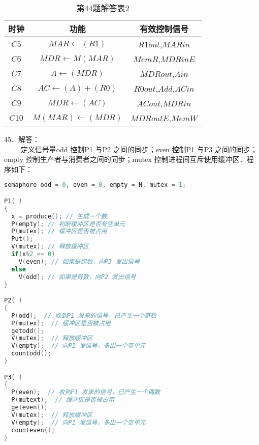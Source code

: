 \begin{table}[ht]
\centering
\caption{第44题解答表2}\label{CSN09_tab7}
\begin{tabular}{|c|c|c|}
\hline
时钟 & 功能 & 有效控制信号 \\
\hline
$C5$ & $MAR\leftarrow(R1)$ & $R1out$,$MARin$ \\
\hline
$C6$ & $MDR\leftarrow M(MAR)$ & $MemR$,$MDRinE$ \\
\hline
$C7$ & $A\leftarrow(MDR)$ & $MDRout$,$Ain$ \\
\hline
$C8$ & $AC\leftarrow(A)+(R0)$ & $R0out$,$Add$,$ACin$ \\
\hline
$C9$ & $MDR\leftarrow(AC)$ & $ACout$,$MDRin$ \\
\hline
$C10$ & $M(MAR)\leftarrow(MDR)$ & $MDRoutE$,$MemW$ \\
\hline
\end{tabular}
\end{table}

45．解答： \\
$\qquad$ 定义信号量odd 控制P1 与P2 之间的同步；even 控制P1 与P3 之间的同步；empty 控制生产者与消费者之间的同步；mutex 控制进程间互斥使用缓冲区．程序如下：
\begin{lstlisting}[language=cpp]
semaphore odd = 0, even = 0, empty = N, mutex = 1;

P1( )
{
  x = produce(); // 生成一个数
  P(empty); // 判断缓冲区是否有空单元
  P(mutex); // 缓冲区是否被占用
  Put();
  V(mutex); // 释放缓冲区
  if(x%2 == 0)
    V(even); // 如果是偶数，向P3 发出信号
  else
    V(odd); // 如果是奇数，向P2 发出信号
}

P2( )
{
  P(odd);  // 收到P1 发来的信号，已产生一个奇数
  P(mutex);  // 缓冲区是否被占用
  getodd();
  V(mutex);  // 释放缓冲区
  V(empty);  // 向P1 发信号，多出一个空单元
  countodd();
}

P3( )
{
  P(even);  // 收到P1 发来的信号，已产生一个偶数
  P(mutext);  // 缓冲区是否被占用
  geteven();
  V(mutex);  // 释放缓冲区
  V(empty);  // 向P1 发信号，多出一个空单元
  counteven();
}
\end{lstlisting}

